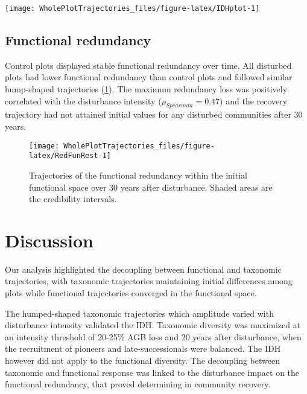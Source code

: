 \documentclass[fleqn,10pt]{ArtEcoFoG} %
\begin{document}
\begin{figure*}

{\centering \texttt{[image: WholePlotTrajectories\_files/figure-latex/IDHplot-1]} 

}

\caption{Relationship between the initial \%AGB loss and community taxonomic richness \textbf{(a)}, taxonomic evenness \textbf{(b)}, functional richness \textbf{(c)},and functional evenness \textbf{(d)} at 10, 20 and 30 years after disturbance}\label{fig:IDHplot}
\end{figure*}

\subsection{Functional redundancy}\label{functional-redundancy}

Control plots displayed stable functional redundancy over time. All
disturbed plots had lower functional redundancy than control plots and
followed similar hump-shaped trajectories (\ref{fig:RedFunRest}). The
maximum redundancy loss was positively correlated with the disturbance
intensity (\(\rho_{Spearman}=0.47\)) and the recovery trajectory had not
attained initial values for any disturbed communities after 30 years.

\begin{figure}

{\centering \texttt{[image: WholePlotTrajectories\_files/figure-latex/RedFunRest-1]} 

}

\caption{Trajectories of the functional redundancy within the initial functional space over 30 years after disturbance. Shaded areas are the credibility intervals.}\label{fig:RedFunRest}
\end{figure}

\section{Discussion}\label{discussion}

Our analysis highlighted the decoupling between functional and taxonomic
trajectories, with taxonomic trajectories maintaining initial
differences among plots while functional trajectories converged in the
functional space.

The humped-shaped taxonomic trajectories which amplitude varied with
disturbance intensity validated the IDH. Taxonomic diversity was
maximized at an intensity threshold of 20-25\% AGB loss and 20 years
after disturbance, when the recruitment of pioneers and
late-successionals were balanced. The IDH however did not apply to the
functional diversity. The decoupling between taxonomic and functional
response was linked to the disturbance impact on the functional
redundancy, that proved determining in community recovery.
\end{document}
